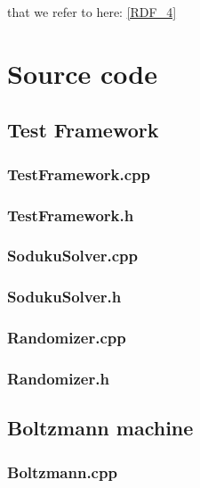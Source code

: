 \documentclass[a4paper,11pt]{kth-mag}
\begin{document}
that we refer to here: \ref{RDF_4}

\chapter{Source code}
\lstset{language=C++}

\section{Test Framework}
\subsection{TestFramework.cpp}

\subsection{TestFramework.h}


\subsection{SodukuSolver.cpp}

\subsection{SodukuSolver.h}


\subsection{Randomizer.cpp}

\subsection{Randomizer.h}


\section{Boltzmann machine}
\subsection{Boltzmann.cpp}

\end{document}

